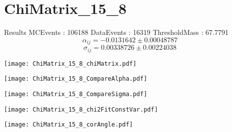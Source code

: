 \documentclass[a4paper,12pt]{article}
\begin{document}
\section{ChiMatrix\_15\_8}
\begin{minipage}{0.49\linewidth} Results \newline
MCEvents : 106188\newline
DataEvents : 16319 \newline
ThresholdMass : 67.7791\\
$$\alpha_{ij} = -0.0131642\pm 0.00048787$$
$$\sigma_{ij} = 0.00338726\pm 0.00224038$$
\end{minipage}\hfill
\begin{minipage}{0.49\linewidth} 
\texttt{[image: ChiMatrix\_15\_8\_chiMatrix.pdf]}\\
\end{minipage}
\hfill
\begin{minipage}{0.49\linewidth} 
\texttt{[image: ChiMatrix\_15\_8\_CompareAlpha.pdf]}\\
\end{minipage}
\hfill
\begin{minipage}{0.49\linewidth} 
\texttt{[image: ChiMatrix\_15\_8\_CompareSigma.pdf]}\\
\end{minipage}
\begin{minipage}{0.49\linewidth} 
\texttt{[image: ChiMatrix\_15\_8\_chi2FitConstVar.pdf]}\\
\end{minipage}
\hfill
\begin{minipage}{0.49\linewidth} 
\texttt{[image: ChiMatrix\_15\_8\_corAngle.pdf]}\\
\end{minipage}
\end{document}
